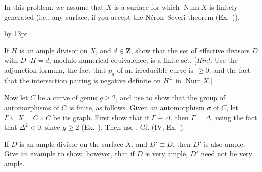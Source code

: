{{\smallskip
\noindent\hypertarget{ex-V-1.11}{}In this problem, we assume that $X$ is a surface for which $\operatorname{Num}X$ is finitely generated (i.e., any surface, if you accept the N\'eron--Severi theorem (Ex.~)).
{\advance\leftskip by 13pt\par
\noindent\hypertarget{ex-V-1.11a}{}If $H$ is an ample divisor on $X$, and $d\in\mathbf Z$, show that the set of effective divisors $D$ with $D\cdot H=d$, modulo numerical equivalence, is a finite set. [\emph{Hint:} Use the adjunction formula, the fact that $p_a$ of an irreducible curve is $\geq0$, and the fact that the intersection pairing is negative definite on $H^\perp$ in $\operatorname{Num}X$.]

\noindent\hypertarget{ex-V-1.11b}{}Now let $C$ be a curve of genus $g\geq2$, and use  to show that the group of automorphisms of $C$ is finite, as follows. Given an automorphism $\sigma$ of $C$, let $\Gamma\subseteq X=C\times C$ be its graph. First show that if $\Gamma\equiv\Delta$, then $\Gamma=\Delta$, using the fact that $\Delta^2<0$, since $g\geq2$ (Ex.~). Then use . Cf. (IV, Ex.~).\par}

\smallskip
\noindent\hypertarget{ex-V-1.12}{}If $D$ is an ample divisor on the surface $X$, and $D'\equiv D$, then $D'$ is also ample. Give an example to show, however, that if $D$ is very ample, $D'$ need not be very ample.\par}
}

